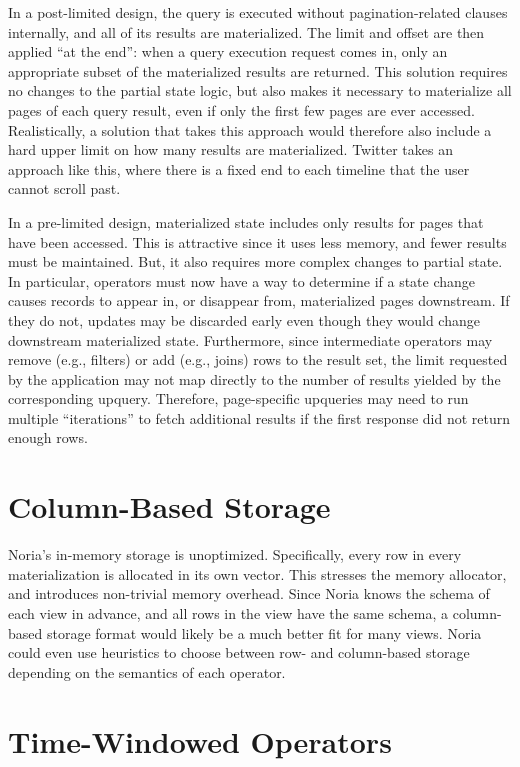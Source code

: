 In a post-limited design, the query is executed without pagination-related
clauses internally, and all of its results are materialized. The limit and
offset are then applied ``at the end'': when a query execution request comes in,
only an appropriate subset of the materialized results are returned. This
solution requires no changes to the partial state logic, but also makes it
necessary to materialize all pages of each query result, even if only the first
few pages are ever accessed. Realistically, a solution that takes this approach
would therefore also include a hard upper limit on how many results are
materialized. Twitter takes an approach like this, where there is a fixed end to
each timeline that the user cannot scroll past.

In a pre-limited design, materialized state includes only results for pages that
have been accessed. This is attractive since it uses less memory, and fewer
results must be maintained. But, it also requires more complex changes to
partial state. In particular, operators must now have a way to determine if a
state change causes records to appear in, or disappear from, materialized pages
downstream. If they do not, updates may be discarded early even though they
would change downstream materialized state. Furthermore, since intermediate
operators may remove (e.g., filters) or add (e.g., joins) rows to the result set,
the limit requested by the application may not map directly to the number of
results yielded by the corresponding upquery. Therefore, page-specific upqueries
may need to run multiple ``iterations'' to fetch additional results if the first
response did not return enough rows.

\section{Column-Based Storage}

Noria's in-memory storage is unoptimized. Specifically, every row in every
materialization is allocated in its own vector. This stresses the memory
allocator, and introduces non-trivial memory overhead. Since Noria knows the
schema of each view in advance, and all rows in the view have the same schema, a
column-based storage format would likely be a much better fit for many views.
Noria could even use heuristics to choose between row- and column-based storage
depending on the semantics of each operator.

\section{Time-Windowed Operators}


